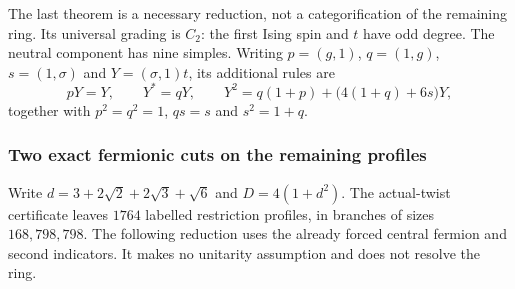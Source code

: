 The last theorem is a necessary reduction, not a categorification of
the remaining ring. Its universal grading is $C_2$: the first Ising
spin and $t$ have odd degree. The neutral component has nine simples.
Writing $p=(g,1)$, $q=(1,g)$, $s=(1,\sigma)$ and $Y=(\sigma,1)t$,
its additional rules are
\[
 pY=Y,\qquad Y^*=qY,\qquad
 Y^2=q(1+p)+\bigl(4(1+q)+6s\bigr)Y,
\]
together with $p^2=q^2=1$, $qs=s$ and $s^2=1+q$.

\subsubsection{Two exact fermionic cuts on the remaining profiles}

Write $d=3+2\sqrt2+2\sqrt3+\sqrt6$ and $D=4(1+d^2)$.
The actual-twist certificate leaves $1764$ labelled restriction
profiles, in branches of sizes $168,798,798$.
The following reduction uses the already forced central fermion and second
indicators. It makes no unitarity assumption and does not resolve the ring.

